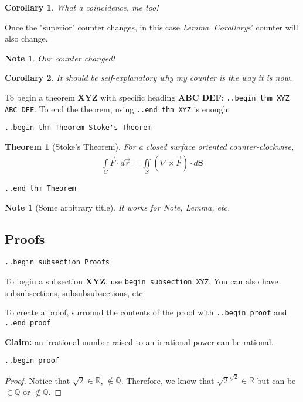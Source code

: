\documentclass[12pt]{article}
\newtheorem*{Theorem}{Theorem}
\newtheorem{Corollary}{Corollary}[Lemma]
\newtheorem{Note}[Lemma]{Note}
\begin{document}
\begin{flushleft}
\begin{Corollary}
What a coincidence, me too!
\end{Corollary}

Once the "superior" counter changes, in this case \emph{Lemma}, \emph{Corollary}s' counter will also change.

\begin{Note}
Our counter changed!
\end{Note}

\begin{Corollary}
It should be self-explanatory why my counter is the way it is now.
\end{Corollary}

\bigskip
To begin a theorem \textbf{XYZ} with specific heading \textbf{ABC DEF}: \verb|..begin thm XYZ ABC DEF|. To end the theorem, using \verb|..end thm XYZ| is enough.

\medskip
\verb|..begin thm Theorem Stoke's Theorem|
\begin{Theorem}[Stoke's Theorem]
For a closed surface oriented counter-clockwise,
\begin{gather*}
\int\limits_C \vec{F} \cdot d\vec{r} = \iint\limits_S (\nabla \times \vec{F}) \cdot d\textbf{S} 
\end{gather*}
\end{Theorem}
\verb|..end thm Theorem|
\medskip

\begin{Note}[Some arbitrary title]
It works for \emph{Note}, \emph{Lemma}, etc.
\end{Note}

\newpage

\subsection*{Proofs}
\verb|..begin subsection Proofs|

To begin a subsection \textbf{XYZ}, use \verb|begin subsection XYZ|. You can also have subsubsections, subsubsubsections, etc.

To create a proof, surround the contents of the proof with \verb|..begin proof| and \verb|..end proof|

\bigskip

\textbf{Claim:} an irrational number raised to an irrational power can be rational.

\medskip
\verb|..begin proof|
\begin{proof}

Notice that $\sqrt{2} \in \mathbb{R}$, $\notin \mathbb{Q}$. Therefore, we know that $\sqrt{2}^{\sqrt{2}} \in \mathbb{R}$ but can be $\in \mathbb{Q}$ or $\notin \mathbb{Q}$.


\end{proof}
\end{flushleft}
\end{document}

